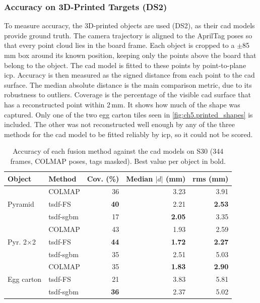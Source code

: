 \subsubsection{Accuracy on 3D-Printed Targets (DS2)}
To measure accuracy, the 3D-printed objects are used (DS2), as their \gls{cad} models provide ground truth.
 The camera trajectory is aligned to the AprilTag poses so that every point cloud lies in the board frame. 
 Each object is cropped to a $\pm$85\,mm box around its known position, keeping only the points above the board 
 that belong to the object. The \gls{cad} model is fitted to these points by point-to-plane \gls{icp}. 
     Accuracy is then measured as the signed distance
    from each point to the \gls{cad} surface. The median absolute distance is the main comparison metric, due to its robustness to outliers.
     Coverage is the percentage of the visible \gls{cad} surface that has a reconstructed point within 2\,mm. 
     It shows how much of the shape was captured.
     Only one of the two egg carton tiles seen in \autoref{fig:ch5.printed_shapes} is included. The other was not
     reconstructed well enough by any of the three methods for the \gls{cad} model to be fitted reliably by \gls{icp}, so it
     could not be scored.

\begin{table}[H]
\centering
\small
\setlength{\tabcolsep}{5pt}
\caption{Accuracy of each fusion method against the \acrshort{cad} models on S30 (344 frames, COLMAP poses, tags
masked). Best value per object in bold.}
\label{tab:fusion_accuracy}
\begin{tabular}{llrrr}
\toprule
Object & Method & Cov. (\%) & Median $|d|$ (mm) & \acrshort{rms} (mm) \\
\midrule
\multirow{3}{*}{Pyramid}         & COLMAP    & 36          & 3.23          & 3.91          \\
                                 & \acrshort{tsdf}-FS   & \textbf{40} & 2.21          & \textbf{2.53} \\
                                 & \acrshort{tsdf}-\acrshort{sgbm} & 17          & \textbf{2.05} & 3.35          \\
\midrule
\multirow{3}{*}{Pyr. 2$\times$2} & COLMAP    & 43          & 1.93          & 2.59          \\
                                 & \acrshort{tsdf}-FS   & \textbf{44} & \textbf{1.72} & \textbf{2.27} \\
                                 & \acrshort{tsdf}-\acrshort{sgbm} & 35          & 2.51          & 5.03          \\
\midrule
\multirow{3}{*}{Egg carton}      & COLMAP    & 35          & \textbf{1.83} & \textbf{2.90} \\
                                 & \acrshort{tsdf}-FS   & 21          & 3.83          & 5.81          \\
                                 & \acrshort{tsdf}-\acrshort{sgbm} & \textbf{36} & 2.37          & 5.02          \\
\bottomrule
\end{tabular}
\end{table}


